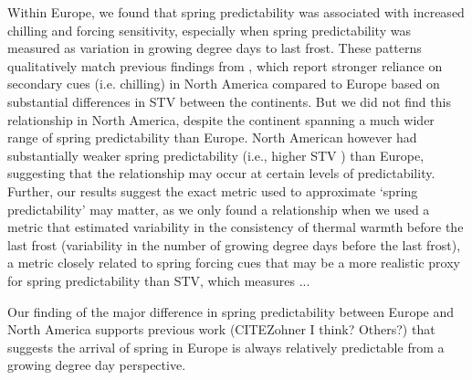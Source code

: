 \documentclass[12pt]{article}
\begin{document}
Within Europe, we found that spring predictability was associated with increased chilling and forcing sensitivity, especially when spring predictability was measured as variation in growing degree days to last frost. These patterns qualitatively match previous findings from \citet{Zohner:2017aa}, which report stronger reliance on secondary cues (i.e. chilling) in North America compared to Europe based on substantial differences in STV between the continents. %
But we did not find this relationship in North America, despite the continent spanning a much wider range of spring predictability than Europe. North American however had substantially weaker spring predictability (i.e., higher STV ) than Europe, suggesting that the relationship may occur at certain levels of predictability. Further, our results suggest the exact metric used to approximate `spring predictability' may matter, as we only found a relationship when we used a metric that estimated variability in the consistency of thermal warmth before the last frost (variability in the number of growing degree days before the last frost), a metric closely related to spring forcing cues that may be a more realistic proxy for spring predictability than STV, which measures ... %

Our finding of the major difference in spring predictability between Europe and North America supports previous work (CITEZohner I think? Others?) that suggests the arrival of spring in Europe is always relatively predictable from a growing degree day perspective. %
\end{document}
